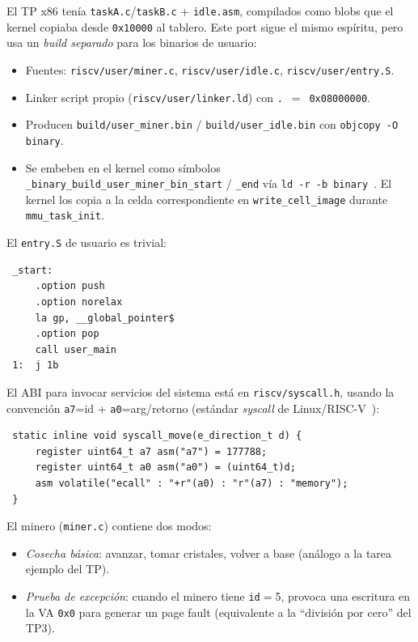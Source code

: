 El TP x86 tenía \texttt{taskA.c}/\texttt{taskB.c} + \texttt{idle.asm}, compilados como blobs que el kernel copiaba desde
\texttt{0x10000} al tablero. Este port sigue el mismo espíritu, pero usa un \emph{build separado} para los binarios de
usuario:

\begin{itemize}
  \item Fuentes: \texttt{riscv/user/miner.c}, \texttt{riscv/user/idle.c}, \texttt{riscv/user/entry.S}.
  \item Linker script propio (\texttt{riscv/user/linker.ld}) con \texttt{.}~$=$~\texttt{0x08000000}.
  \item Producen \texttt{build/user\_miner.bin} / \texttt{build/user\_idle.bin} con \texttt{objcopy -O binary}.
  \item Se embeben en el kernel como símbolos \texttt{\_binary\_build\_user\_miner\_bin\_start} / \texttt{\_end} vía
  \texttt{ld -r -b binary}~\cite{gnu-ld}. El kernel los copia a la celda correspondiente en \texttt{write\_cell\_image}
  durante \texttt{mmu\_task\_init}.
\end{itemize}

El \texttt{entry.S} de usuario es trivial:

\begin{codesnippet}
\begin{verbatim}
 _start:
     .option push
     .option norelax
     la gp, __global_pointer$
     .option pop
     call user_main
 1:  j 1b
\end{verbatim}
\end{codesnippet}

El ABI para invocar servicios del sistema está en \texttt{riscv/syscall.h}, usando la convención \texttt{a7}=id +
\texttt{a0}=arg/retorno (estándar \emph{syscall} de Linux/RISC-V~\cite{riscv-psabi}):

\begin{codesnippet}
\begin{verbatim}
 static inline void syscall_move(e_direction_t d) {
     register uint64_t a7 asm("a7") = 177788;
     register uint64_t a0 asm("a0") = (uint64_t)d;
     asm volatile("ecall" : "+r"(a0) : "r"(a7) : "memory");
 }
\end{verbatim}
\end{codesnippet}

El minero (\texttt{miner.c}) contiene dos modos:

\begin{itemize}
  \item \emph{Cosecha básica}: avanzar, tomar cristales, volver a base (análogo a la tarea ejemplo del TP).
  \item \emph{Prueba de excepción}: cuando el minero tiene \texttt{id}$=$5, provoca una escritura en la VA \texttt{0x0}
  para generar un page fault (equivalente a la ``división por cero'' del TP3).
\end{itemize}
